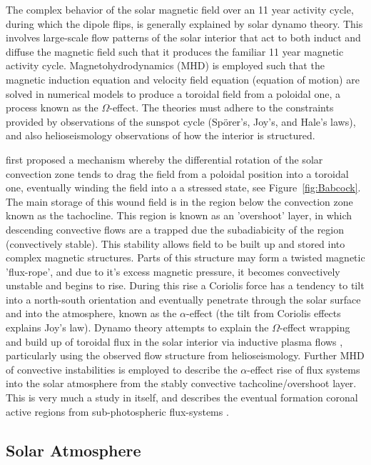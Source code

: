 The complex behavior of the solar magnetic field over an 11 year activity cycle, during which the dipole flips, is generally explained by solar dynamo theory. This involves large-scale flow patterns of the solar interior that act to both induct and diffuse the magnetic field such that it produces the familiar 11 year magnetic activity cycle. Magnetohydrodynamics (MHD) is employed such that the magnetic induction equation and velocity field equation (equation of motion) are solved in numerical models to produce a toroidal field from a poloidal one, a process known as the $\Omega$-effect. The theories must adhere to the constraints provided by observations of the sunspot cycle (Sp\"{o}rer's, Joy's, and Hale's laws), and also helioseismology observations of how the interior is structured.


\citet{babcock1961} first proposed a mechanism whereby the differential rotation of the solar convection zone tends to drag the field from a poloidal position into a toroidal one, eventually winding the field into a a stressed state, see Figure~\ref{fig:Babcock}. The main storage of this wound field is in the region below the convection zone known as the tachocline. This region is known as an 'overshoot' layer, in which descending convective flows are a trapped due the subadiabicity of the region (convectively stable). This stability allows field to be built up and stored into complex magnetic structures. Parts of this structure may form a twisted magnetic 'flux-rope', and due to it's excess magnetic pressure, it becomes convectively unstable and begins to rise. During this rise a Coriolis force has a tendency to tilt into a north-south orientation and eventually penetrate through the solar surface and into the atmosphere, known as the $\alpha$-effect (the tilt from Coriolis effects explains Joy's law). Dynamo theory attempts to explain the $\Omega$-effect wrapping and build up of toroidal flux in the solar interior via inductive plasma flows \citep{charbon2010}, particularly using the observed flow structure from helioseismology. Further MHD of convective instabilities is employed to describe the $\alpha$-effect rise of flux systems into the solar atmosphere from the stably convective tachcoline/overshoot layer. This is very much a study in itself, and describes the eventual formation coronal active regions from sub-photospheric flux-systems \citep{fan2009}. 


\subsection{Solar Atmosphere}\label{sec:12}

